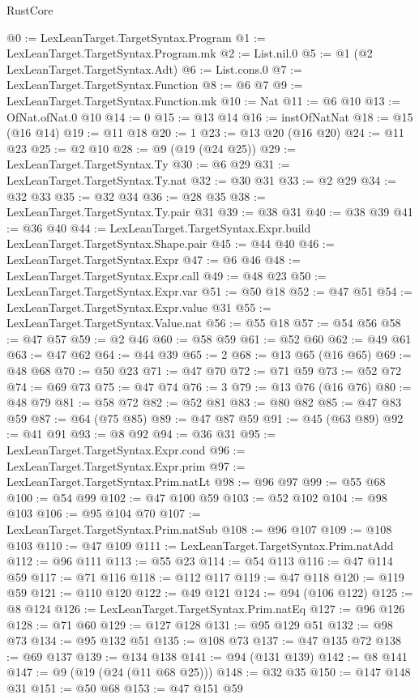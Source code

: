\begin{lexlean}{RustCore}
\begin{coremodule}
@0 := LexLeanTarget.TargetSyntax.Program
@1 := LexLeanTarget.TargetSyntax.Program.mk
@2 := List.nil.{0}
@5 := @1 (@2 LexLeanTarget.TargetSyntax.Adt)
@6 := List.cons.{0}
@7 := LexLeanTarget.TargetSyntax.Function
@8 := @6 @7
@9 := LexLeanTarget.TargetSyntax.Function.mk
@10 := Nat
@11 := @6 @10
@13 := OfNat.ofNat.{0} @10
@14 := 0
@15 := @13 @14
@16 := instOfNatNat
@18 := @15 (@16 @14)
@19 := @11 @18
@20 := 1
@23 := @13 @20 (@16 @20)
@24 := @11 @23
@25 := @2 @10
@28 := @9 (@19 (@24 @25))
@29 := LexLeanTarget.TargetSyntax.Ty
@30 := @6 @29
@31 := LexLeanTarget.TargetSyntax.Ty.nat
@32 := @30 @31
@33 := @2 @29
@34 := @32 @33
@35 := @32 @34
@36 := @28 @35
@38 := LexLeanTarget.TargetSyntax.Ty.pair @31
@39 := @38 @31
@40 := @38 @39
@41 := @36 @40
@44 := LexLeanTarget.TargetSyntax.Expr.build LexLeanTarget.TargetSyntax.Shape.pair
@45 := @44 @40
@46 := LexLeanTarget.TargetSyntax.Expr
@47 := @6 @46
@48 := LexLeanTarget.TargetSyntax.Expr.call
@49 := @48 @23
@50 := LexLeanTarget.TargetSyntax.Expr.var
@51 := @50 @18
@52 := @47 @51
@54 := LexLeanTarget.TargetSyntax.Expr.value @31
@55 := LexLeanTarget.TargetSyntax.Value.nat
@56 := @55 @18
@57 := @54 @56
@58 := @47 @57
@59 := @2 @46
@60 := @58 @59
@61 := @52 @60
@62 := @49 @61
@63 := @47 @62
@64 := @44 @39
@65 := 2
@68 := @13 @65 (@16 @65)
@69 := @48 @68
@70 := @50 @23
@71 := @47 @70
@72 := @71 @59
@73 := @52 @72
@74 := @69 @73
@75 := @47 @74
@76 := 3
@79 := @13 @76 (@16 @76)
@80 := @48 @79
@81 := @58 @72
@82 := @52 @81
@83 := @80 @82
@85 := @47 @83 @59
@87 := @64 (@75 @85)
@89 := @47 @87 @59
@91 := @45 (@63 @89)
@92 := @41 @91
@93 := @8 @92
@94 := @36 @31
@95 := LexLeanTarget.TargetSyntax.Expr.cond
@96 := LexLeanTarget.TargetSyntax.Expr.prim
@97 := LexLeanTarget.TargetSyntax.Prim.natLt
@98 := @96 @97
@99 := @55 @68
@100 := @54 @99
@102 := @47 @100 @59
@103 := @52 @102
@104 := @98 @103
@106 := @95 @104 @70
@107 := LexLeanTarget.TargetSyntax.Prim.natSub
@108 := @96 @107
@109 := @108 @103
@110 := @47 @109
@111 := LexLeanTarget.TargetSyntax.Prim.natAdd
@112 := @96 @111
@113 := @55 @23
@114 := @54 @113
@116 := @47 @114 @59
@117 := @71 @116
@118 := @112 @117
@119 := @47 @118
@120 := @119 @59
@121 := @110 @120
@122 := @49 @121
@124 := @94 (@106 @122)
@125 := @8 @124
@126 := LexLeanTarget.TargetSyntax.Prim.natEq
@127 := @96 @126
@128 := @71 @60
@129 := @127 @128
@131 := @95 @129 @51
@132 := @98 @73
@134 := @95 @132 @51
@135 := @108 @73
@137 := @47 @135 @72
@138 := @69 @137
@139 := @134 @138
@141 := @94 (@131 @139)
@142 := @8 @141
@147 := @9 (@19 (@24 (@11 @68 @25)))
@148 := @32 @35
@150 := @147 @148 @31
@151 := @50 @68
@153 := @47 @151 @59

\end{coremodule}
\end{lexlean}
